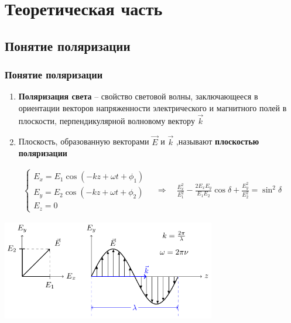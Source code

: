 \documentclass[10pt,pdf,hyperref={unicode}, dvipsnames, handout]{beamer}
\begin{document}
\section{Теоретическая часть}
\begin{frame}[t]
	\subsection{Понятие поляризации}
	\frametitle{Понятие поляризации}
\begin{enumerate}
	\item \textbf{Поляризация света} -- свойство световой волны, заключающееся в  ориентации векторов напряженности электрического и магнитного полей в плоскости, перпендикулярной волновому вектору $\vec{k}$
	\item Плоскость, образованную векторами $\vec{E}$ и $\vec{k}$ ,называют \textbf{плоскостью поляризации}
\end{enumerate}
	\begin{gather*}
		\begin{cases} 
			E_x = E_1\cos\left(-kz+\omega t+ \phi_1\right) \\
			E_y = E_2\cos\left(-kz+\omega t+ \phi_2\right) \\
			E_z = 0
		\end{cases}
		\quad\Rightarrow\quad
		\frac{E_x^2}{E_1^2}-\frac{2E_xE_y}{E_1E_2}\cos\delta+\frac{E_y^2}{E_2^2}=\sin^2\delta
	\end{gather*}
	\begin{center}
		\includegraphics[width=0.7\textwidth]{img/e}
	\end{center}
\end{frame}
\end{document}
